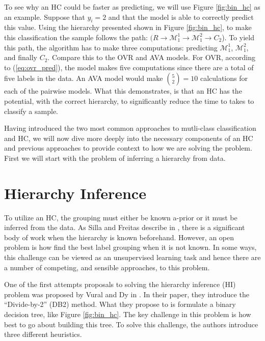 \documentclass[../thesis.tex]{subfiles}
\begin{document}
To see why an HC could be faster as predicting, we will use Figure \ref{fig:bin_hc} as an example. Suppose that $y_i = 2$ and that the model is able to correctly predict this value. Using the hierarchy presented shown in Figure \ref{fig:bin_hc}, to make this classification the sample follows the path: $(R \rightarrow \mathcal{M}_1^1 \rightarrow \mathcal{M}_1^2 \rightarrow C_2$). To yield this path, the algorithm has to make three computations: predicting $\mathcal{M}_1^1$, $\mathcal{M}_1^2$, and finally $C_2$. Compare this to the OVR and AVA models. For OVR, according to (\ref{eq:ovr_pred}), the model makes five computations since there are a total of five labels in the data. An AVA model would make $\binom{5}{2} = 10$ calculations for each of the pairwise models. What this demonstrates, is that an HC has the potential, with the correct hierarchy, to significantly reduce the time to takes to classify a sample. 

Having introduced the two most common approaches to mutli-class classification and HC, we will now dive more deeply into the necessary components of an HC and previous approaches to provide context to how we are solving the problem. First we will start with the problem of inferring a hierarchy from data.

\section{Hierarchy Inference}
To utilize an HC, the grouping must either be known a-prior or it must be inferred from the data. As Silla and Freitas describe in \cite{silla2011survey}, there is a significant body of work when the hierarchy is known beforehand. However, an open problem is how find the best label grouping when it is not known. In some ways, this challenge can be viewed as an unsupervised learning task and hence there are a number of competing, and sensible approaches, to this problem.

One of the first attempts proposals to solving the hierarchy inference (HI) problem was proposed by Vural and Dy in \cite{vural2004hierarchical}. In their paper, they introduce the ``Divide-by-2'' (DB2) method. What they propose to is formulate a binary decision tree, like Figure \ref{fig:bin_hc}. The key challenge in this problem is how best to go about building this tree. To solve this challenge, the authors introduce three different heuristics.
\end{document}
